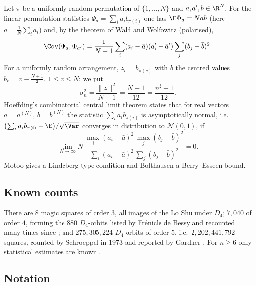Let $\pi$ be a uniformly random permutation of $\{1,\dots,N\}$ and $a,a',b\in\R^N$.
For the linear permutation statistics $\Phi_a=\sum_ia_ib_{\pi(i)}$ one has $\E\Phi_a=N\bar a\bar b$ (here $\bar a=\frac1N\sum_ia_i$) and, by the theorem of Wald and Wolfowitz \cite{waldwolfowitz1944,noether1949} (polarised),
\begin{equation}
\Cov(\Phi_a,\Phi_{a'})=\frac{1}{N-1}\sum_i(a_i-\bar a)(a'_i-\bar a')\sum_j(b_j-\bar b)^2 .
\label{eq:ww_identity}
\end{equation}
For a uniformly random arrangement, $z_c=b_{\pi(c)}$ with $b$ the centred values $b_v=v-\frac{N+1}2$, $1\le v\le N$; we put
\begin{equation}
\sigma_n^2=\frac{\|z\|^2}{N-1}=\frac{N+1}{12}=\frac{n^2+1}{12}.
\label{eq:sigma}
\end{equation}
Hoeffding's combinatorial central limit theorem \cite[Thm.~4 and condition~(14), p.~560]{hoeffding1951} states that for real vectors $a=a^{(N)}$, $b=b^{(N)}$ the statistic $\sum_ia_ib_{\pi(i)}$ is asymptotically normal, i.e.\ $\bigl(\sum_ia_ib_{\pi(i)}-\E\bigr)/\sqrt{\Var}$ converges in distribution to $\mathcal N(0,1)$, if
\begin{equation}
\lim_{N\to\infty}N\,\frac{\max_i(a_i-\bar a)^2\,\max_j(b_j-\bar b)^2}{\sum_i(a_i-\bar a)^2\,\sum_j(b_j-\bar b)^2}=0 .
\label{eq:hoeffding_max}
\end{equation}
Motoo \cite{motoo1957} gives a Lindeberg-type condition and Bolthausen \cite{bolthausen1984} a Berry--Esseen bound.

\subsection{Known counts}
\label{sec:bg_polytopes}

There are $8$ magic squares of order $3$, all images of the Lo Shu under $D_4$; $7{,}040$ of order $4$, forming the $880$ $D_4$-orbits listed by Fr\'enicle de Bessy \cite{frenicle1693} and recounted many times since \cite{beck2010enumeration}; and $275{,}305{,}224$ $D_4$-orbits of order $5$, i.e.\ $2{,}202{,}441{,}792$ squares, counted by Schroeppel in 1973 and reported by Gardner \cite{gardner1976}.
For $n\ge6$ only statistical estimates are known \cite{pinn1998number,trump2012enumeration}.

\subsection{Notation}
\label{sec:notation}

